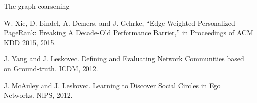 \documentclass[11pt]{article}
\begin{document}
The graph coarsening 














\begin{thebibliography}{3}

        W. Xie, D. Bindel, A. Demers, and J. Gehrke, “Edge-Weighted Personalized
PageRank: Breaking A Decade-Old Performance Barrier,” in Proceedings of ACM KDD
2015, 2015.  

        J. Yang and J. Leskovec. Defining and Evaluating Network Communities based on Ground-truth. ICDM, 2012.

        J. McAuley and J. Leskovec. Learning to Discover Social Circles in Ego
Networks. NIPS, 2012.

\end{thebibliography}
\end{document}
